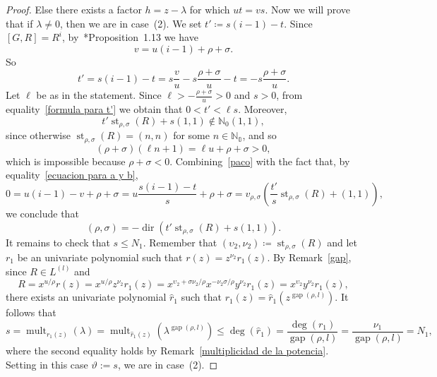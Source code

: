 \documentclass[reqno,a4paper]{amsart}
\theoremstyle{definition}
\theoremstyle{remark}
\DeclareMathOperator{\st}{st}
\DeclareMathOperator{\dir}{dir}
\DeclareMathOperator{\mult}{mult}
\DeclareMathOperator{\gap}{gap}
\begin{document}
\begin{proof}
Else there exists a factor $h=z-\lambda$ for which $ut=vs$. Now we will prove that if $\lambda\ne0$, then we are in case~(2). We set $t'\coloneqq s(i-1)-t$. Since $[G,R]= R^i$, by~\cite{GGV}*{Proposition~1.13} we have
\begin{equation}\label{ecuacion para a y b}
v=u(i-1)+\rho+\sigma.
\end{equation}
So
\begin{equation}\label{formula para t'}
t'=s(i-1)-t= s\frac{v}{u}-s\frac{\rho+\sigma}{u}-t= -s\frac{\rho+\sigma}{u}.
\end{equation}
Let $\ell$ be as in the statement. Since $\ell>-\frac{\rho+\sigma}{u}>0$ and $s>0$, from equality~\eqref{formula para t'} we obtain that $0<t'<\ell s$. Moreover,
\begin{equation}\label{paco}
t'\st_{\rho,\sigma}(R) + s (1,1)\notin\mathds{N}_0(1,1),
\end{equation}
since otherwise $\st_{\rho,\sigma}(R) = (n,n)$ for some $n\in \mathds{N_0}$, and so
$$
(\rho+\sigma)(\ell n+1) = \ell u + \rho + \sigma >0,
$$
which is impossible because $\rho + \sigma<0$. Combining~\eqref{paco} with the fact that, by equality~\eqref{ecuacion para a y b},
$$
0=u(i-1)-v+\rho+\sigma=u\frac{s(i-1)-t}{s}+\rho+\sigma=v_{\rho,\sigma}\left(\frac{t'}{s} \st_{\rho,\sigma}(R) +(1,1)\right),
$$
we conclude that
$$
(\rho,\sigma)=-\dir\left(t'\st_{\rho,\sigma}(R)+ s (1,1)\right).
$$
It remains to check that $s\le N_1$. Remember that $(\upsilon_2,\nu_2)\coloneqq \st_{\rho,\sigma}(R)$ and let $r_1$ be an univariate polynomial
such that $r(z)= z^{\nu_2}r_1(z)$. By Remark~\ref{gap}, since $R\in L^{(l)}$ and
$$
R = x^{u/\rho}r(z) = x^{u/\rho}z^{\nu_2}r_1(z) = x^{\upsilon_2 + \sigma\nu_2/\rho}x^{-\nu_2\sigma/\rho}y^{\nu_2} r_1(z) = x^{\upsilon_2} y^{\nu_2} r_1(z),
$$
there exists an univariate polynomial $\hat{r}_1$ such that $r_1(z)=\hat{r}_1(z^{\gap(\rho,l)})$. It follows that
$$
s=\mult_{r_1(z)}(\lambda)=\mult_{\hat r_1(z)}(\lambda^{\gap(\rho,l)})\le \deg(\hat{r}_1)=\frac{\deg(r_1)}{\gap(\rho,l)}=\frac{\nu_1}{\gap(\rho,l)}=N_1,
$$
where the second equality holds by Remark~\ref{multiplicidad de la potencia}. Setting in this case $\vartheta:=s$, we are in case~(2).


\end{proof}
\end{document}

